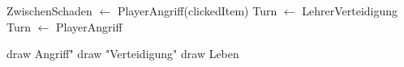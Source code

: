 \begin{frame}
	\begin{algorithm}[H]
		\begin{algorithmic}[1]
			\State ZwischenSchaden $\gets$ PlayerAngriff(clickedItem)
			\State Turn $\gets$ LehrerVerteidigung
			\State Turn $\gets$ PlayerAngriff
			\EndIf
			\EndIf
		\end{algorithmic}
		\caption{PlayerObject.update() pseudocode}
		\label{alg:PlayerUpdate}
	\end{algorithm}
\end{frame}

\begin{frame}
	\begin{algorithm}[H]
		\begin{algorithmic}[1]
			\State draw \dq Angriff"
			\State draw "Verteidigung"
			\EndIf
			\State draw Leben
		\end{algorithmic}
		\caption{draw() pseudocode}
		\label{alg:Draw}
	\end{algorithm}
\end{frame}

